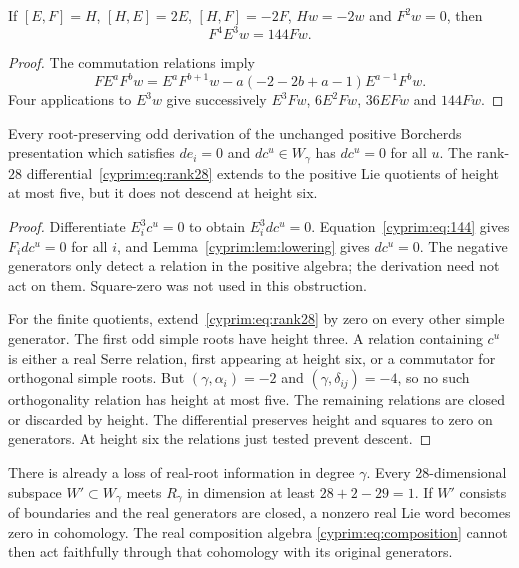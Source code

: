 \begin{lemma}\label{cyprim:lem:sl2}
If $[E,F]=H$, $[H,E]=2E$, $[H,F]=-2F$,
$Hw=-2w$ and $F^2w=0$, then
\begin{equation}\label{cyprim:eq:144}
 F^4E^3w=144Fw.
\end{equation}
\end{lemma}

\begin{proof}
The commutation relations imply
\[
 FE^aF^bw=E^aF^{b+1}w
       -a(-2-2b+a-1)E^{a-1}F^bw.
\]
Four applications to $E^3w$ give successively
$E^3Fw$, $6E^2Fw$, $36EFw$ and $144Fw$.
\end{proof}

\begin{theorem}\label{cyprim:thm:Serre-obstruction}
Every root-preserving odd derivation of the unchanged
positive Borcherds presentation which satisfies $de_i=0$
and $dc^u\in W_\gamma$ has $dc^u=0$ for all $u$.
The rank-$28$ differential~\eqref{cyprim:eq:rank28} extends
to the positive Lie quotients of height at most five,
but it does not descend at height six.
\end{theorem}

\begin{proof}
Differentiate $E_i^3c^u=0$ to obtain $E_i^3dc^u=0$.
Equation~\eqref{cyprim:eq:144} gives $F_idc^u=0$ for all
$i$, and Lemma~\ref{cyprim:lem:lowering} gives $dc^u=0$.
The negative generators only detect a relation in the
positive algebra; the derivation need not act on them.
Square-zero was not used in this obstruction.

For the finite quotients, extend~\eqref{cyprim:eq:rank28}
by zero on every other simple generator. The first odd
simple roots have height three. A relation containing
$c^u$ is either a real Serre relation, first appearing at
height six, or a commutator for orthogonal simple roots.
But $(\gamma,\alpha_i)=-2$ and
$(\gamma,\delta_{ij})=-4$, so no such orthogonality
relation has height at most five. The remaining relations
are closed or discarded by height. The differential
preserves height and squares to zero on generators.
At height six the relations just tested prevent descent.
\end{proof}

There is already a loss of real-root information in degree
$\gamma$. Every $28$-dimensional subspace $W'\subset W_\gamma$
meets $R_\gamma$ in dimension at least
$28+2-29=1$. If $W'$ consists of boundaries and the real
generators are closed, a nonzero real Lie word becomes zero
in cohomology. The real composition algebra
\eqref{cyprim:eq:composition} cannot then act faithfully
through that cohomology with its original generators.


